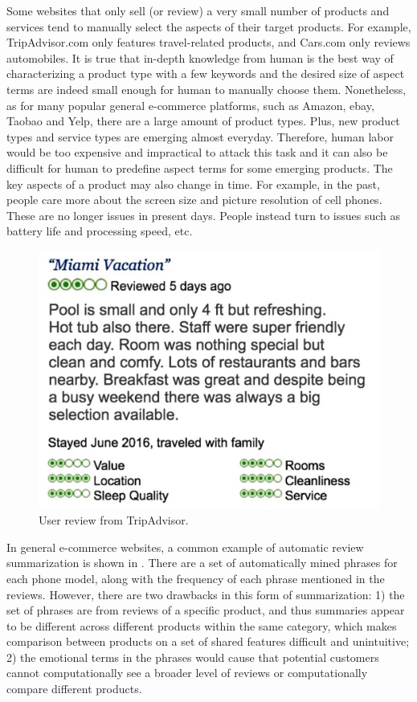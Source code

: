 Some websites that only sell (or review) a very small number of products and services tend to manually select the aspects of their target products.
For example, TripAdvisor.com only features travel-related products, and Cars.com only reviews automobiles. 
It is true that in-depth knowledge from human is the best way of
characterizing a product type with a few keywords
and the desired size of aspect terms are indeed small enough for human to manually choose them.
Nonetheless, as for many popular general  e-commerce platforms, such as Amazon, ebay,  Taobao and Yelp, 
there are a large amount of product types.
Plus, new product types and service types are emerging almost everyday. 
Therefore, human labor would be too expensive and impractical to attack this task and it can also be difficult for human to predefine aspect terms for some emerging products. The key aspects of a product may also change in time.
For example, in the past, people care more about the screen size and picture
resolution of cell phones. These are no longer issues in present days. People
instead turn to issues such as battery life and processing speed, etc.

\begin{figure}[th!]
	\centering
	\includegraphics[width=0.7\columnwidth]{figures/tripadvisor}
	\caption{User review from TripAdvisor.}
	\label{fig:tripadvisor}
\end{figure}
%

In general e-commerce websites, a common example of automatic review summarization 
is shown in . 
There are a set of automatically mined phrases for each phone model, 
along with the frequency of each phrase mentioned in the 
reviews. 
However, there are two drawbacks in this form of summarization:
1) the set of phrases are from reviews of a specific product, and thus 
summaries appear to be different across different products within 
the same category, which makes comparison between products on a set of shared
features difficult and unintuitive;
2) the emotional terms in the phrases would cause that potential customers cannot computationally see a broader level of reviews or computationally compare different products.

